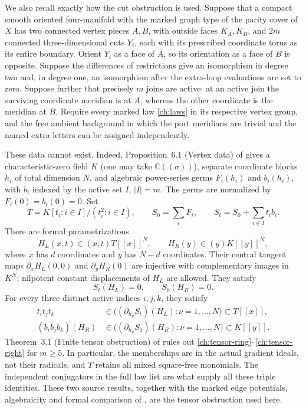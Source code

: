 We also recall exactly how the cut obstruction is used.  Suppose that a
compact smooth oriented four-manifold with the marked graph type of
the parity cover of $X$ has two connected vertex pieces $A,B$, with
outside faces $K_A,K_B$, and $2m$ connected three-dimensional cuts
$Y_i$, each with its prescribed coordinate torus as its entire boundary.
Orient $Y_i$ as a face of $A$, so its orientation as a face of $B$
is opposite.
Suppose the differences of restrictions give an isomorphism in degree
two and, in degree one, an isomorphism after the extra-loop evaluations
are set to zero.  Suppose further that precisely $m$ joins are active:
at an active join the surviving coordinate meridian is at $A$, whereas
the other coordinate is the meridian at $B$.  Require every marked law
\eqref{ch:laws} in its respective vertex group, and the free ambient
background in which the port meridians are trivial and the named extra
letters can be assigned independently.

These data cannot exist.  Indeed, Proposition~6.1 (Vertex data) of
\cite{TO} gives a characteristic-zero field $K$ (one may take
$\mathbb C((\sigma))$), separate coordinate blocks $h_i$ of total
dimension $N$, and algebraic power-series germs $F_i(h_i)$ and
$b_i(h_i)$, with $b_i$ indexed by the active set $I$, $|I|=m$.
The germs are normalized by $F_i(0)=b_i(0)=0$.  Set
\begin{equation}
\label{ch:tensor-ring}
 T=K[t_i:i\in I]/(t_i^2:i\in I),\qquad
 S_0=\sum_iF_i,\qquad S_t=S_0+\sum_{i\in I}t_i b_i.
\end{equation}
There are formal parametrizations
\[
 H_L(x,t)\in(x,t)T[[x]]^N,\qquad
 H_R(y)\in(y)K[[y]]^N,
\]
where $x$ has $d$ coordinates and $y$ has $N-d$ coordinates.  Their
central tangent maps $\partial_xH_L(0,0)$ and $\partial_yH_R(0)$
are injective with complementary images in $K^N$; nilpotent constant
displacements of $H_L$ are allowed.  They satisfy
\begin{equation}
\label{ch:tensor-vanishing}
 S_t(H_L)=0,\qquad S_0(H_R)=0.
\end{equation}
For every three distinct active indices $i,j,k$, they satisfy
\begin{align}
 t_it_jt_k&\in
 \bigl((\partial_{h_\nu}S_t)(H_L):\nu=1,\ldots,N\bigr)
                  \subset T[[x]],\label{ch:tensor-left}\\
 (b_ib_jb_k)(H_R)&\in
 \bigl((\partial_{h_\nu}S_0)(H_R):\nu=1,\ldots,N\bigr)
                  \subset K[[y]].\label{ch:tensor-right}
\end{align}
Theorem~3.1 (Finite tensor obstruction) of \cite{TO} rules out
\eqref{ch:tensor-ring}--\eqref{ch:tensor-right} for $m\geq5$.
In particular, the memberships are in the actual gradient ideals,
not their radicals, and $T$ retains all mixed square-free monomials.
The independent conjugators in the full law list are what supply all
these triple identities. These two source results, together with the
marked edge potentials, algebraicity and formal comparison of
\cite[Proposition~4.5, Theorem~5.1 and Proposition~5.2]{TO}, are the
tensor obstruction used here.

